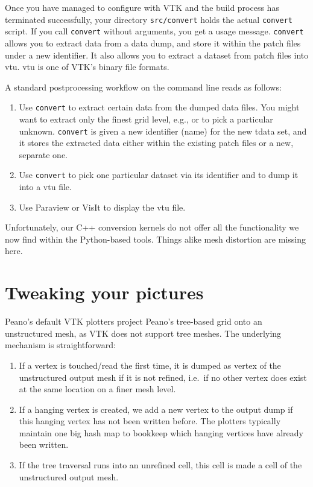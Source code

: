 \noindent
Once you have managed to configure with VTK and the build process has terminated
successfully, your directory \texttt{src/convert} holds the actual \texttt{convert}
script.
If you call \texttt{convert} without arguments, you get a usage message.
\texttt{convert} allows you to extract data from a data dump, and store it
within the patch files under a new identifier.
It also allows you to extract a dataset from patch files into vtu.
vtu is one of VTK's binary file formats.


A standard postprocessing workflow on the command line reads as follows:
\begin{enumerate}
  \item Use \texttt{convert} to extract certain data from the dumped data files.
  You might want to extract only the finest grid level, e.g., or to pick a
  particular unknown. \texttt{convert} is given a new identifier (name) for the
  new tdata set, and it stores the extracted data either within the existing
  patch files or a new, separate one.
  \item Use \texttt{convert} to pick one particular dataset via its identifier
  and to dump it into a vtu file.
  \item Use Paraview or VisIt to display the vtu file.
\end{enumerate}

\begin{remark}
 Unfortunately, our C++ conversion kernels do not offer all the functionality we
 now find within the Python-based tools. Things alike mesh distortion are
 missing here.
\end{remark}


    
\section{Tweaking your pictures}
\label{section:postprocessing:tweaking-pictures}


Peano's default VTK plotters project Peano's tree-based grid onto an
unstructured mesh, as VTK does not support tree meshes.
The underlying mechanism is straightforward:

\begin{enumerate}
  \item If a vertex is touched/read the first time, it is dumped as vertex of
  the unstructured output mesh if it is not refined, i.e.~if no other vertex
  does exist at the same location on a finer mesh level.
  \item If a hanging vertex is created, we add a new vertex to the output dump
  if this hanging vertex has not been written before. The plotters typically
  maintain one big hash map to bookkeep which hanging vertices have already been
  written.
  \item If the tree traversal runs into an unrefined cell, this cell is made a
  cell of the unstructured output mesh.
\end{enumerate}


